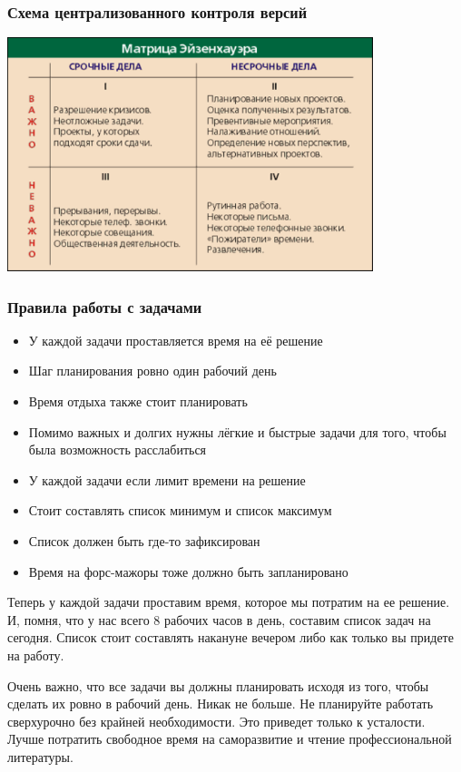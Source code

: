 \documentclass{../industrial-development}
\begin{document}
\begin{frame} \frametitle{Схема централизованного контроля версий}
  \centerline{\includegraphics[width=0.8\textwidth]{EisenhowMeratrix.pdf}}
\end{frame}

\begin{frame} \frametitle{Правила работы с задачами}
  \begin{itemize}
  \item У каждой задачи проставляется время на её решение
  \item Шаг планирования ровно один рабочий день
  \item Время отдыха также стоит планировать
  \item Помимо важных и долгих нужны лёгкие и быстрые задачи для того, чтобы была возможность расслабиться
  \item У каждой задачи если лимит времени на решение
  \item Стоит составлять список минимум и список максимум
  \item Список должен быть где-то зафиксирован
  \item Время на форс-мажоры тоже должно быть запланировано
  \end{itemize}
\end{frame}

\lecturenotes

Теперь у каждой задачи проставим время, которое мы потратим на ее решение. И, помня, что у нас всего 8 рабочих часов в день, составим список задач на сегодня. Список стоит составлять накануне вечером либо как только вы придете на работу.

Очень важно, что все задачи вы должны планировать исходя из того, чтобы сделать их ровно в рабочий день. Никак не больше. Не планируйте работать сверхурочно без крайней необходимости. Это приведет только к усталости. Лучше потратить свободное время на саморазвитие и чтение профессиональной литературы.
\end{document}
